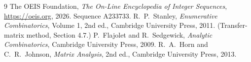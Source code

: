 \documentclass[11pt,a4paper]{article}
\theoremstyle{plain}
\theoremstyle{definition}
\begin{document}
\begin{thebibliography}{9}
 The OEIS Foundation, \emph{The On-Line Encyclopedia of Integer
Sequences}, \url{https://oeis.org}, 2026. Sequence A233733.
 R.~P.~Stanley, \emph{Enumerative Combinatorics}, Volume 1, 2nd ed.,
Cambridge University Press, 2011. (Transfer-matrix method, Section 4.7.)
 P.~Flajolet and R.~Sedgewick, \emph{Analytic Combinatorics}, Cambridge
University Press, 2009.
 R.~A.~Horn and C.~R.~Johnson, \emph{Matrix Analysis}, 2nd ed., Cambridge
University Press, 2013.
\end{thebibliography}
\end{document}
